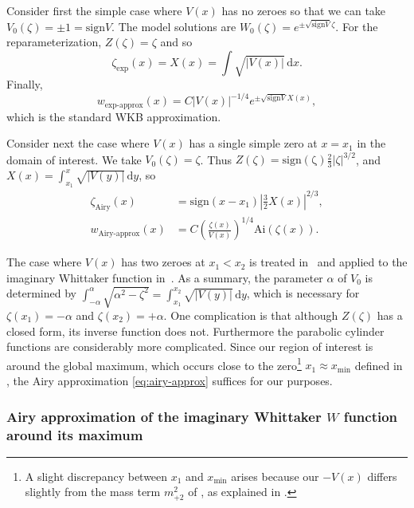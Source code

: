 Consider first the simple case where $V(x)$ has no zeroes so that we can take $V_{0}(\zeta)=\pm1=\mathrm{sign}V$. The model solutions are $W_{0}(\zeta)=e^{\pm\sqrt{\mathrm{sign}V}\zeta}$. For the reparameterization, $Z(\zeta)=\zeta$ and so 
\[
\zeta_{\textrm{exp}}(x)=X(x)=\int\sqrt{\left|V(x)\right|}\,\mathrm{d}x.
\]
 Finally, 
\begin{equation}
w_{\textrm{exp-approx}}(x)=C\left|V(x)\right|^{-1/4}e^{\pm\sqrt{\mathrm{sign}V}X(x)},\label{eq:exp-approx}
\end{equation}
 which is the standard WKB approximation. 

Consider next the case where $V(x)$ has a single simple zero at $x=x_{1}$ in the domain of interest. We take $V_{0}(\zeta)=\zeta$. Thus $Z(\zeta)=\mathrm{sign(\zeta)}\tfrac{2}{3}\left|\zeta\right|^{3/2}$, and $X(x)=\int_{x_{1}}^{x}\sqrt{\left|V(y)\right|}\,\mathrm{d}y$, so 
\begin{align}
\zeta_{\textrm{Airy}}(x) & =\mathrm{sign}(x-x_{1})\left|\tfrac{3}{2}X(x)\right|^{2/3},\\
w_{\textrm{Airy-approx}}(x) & =C\left(\frac{\zeta(x)}{V(x)}\right)^{1/4}\mathrm{Ai}\left(\zeta(x)\right).\label{eq:airy-approx}
\end{align}

The case where $V(x)$ has two zeroes at $x_{1}<x_{2}$ is treated in~\cite{Olver137} and applied to the imaginary Whittaker function in~\cite{Olver_1980}. As a summary, the parameter $\alpha$ of $V_{0}$ is determined by $\int_{-\alpha}^{\alpha}\sqrt{\alpha^{2}-\zeta^{2}}=\int_{x_{1}}^{x_{2}}\sqrt{\left|V(y)\right|}\,\mathrm{d}y$, which is necessary for $\zeta(x_{1})=-\alpha$ and $\zeta(x_{2})=+\alpha$. One complication is that although $Z(\zeta)$ has a closed form, its inverse function does not. Furthermore the parabolic cylinder functions are considerably more complicated. Since our region of interest is around the global maximum, which occurs close to the zero\footnote{A slight discrepancy between $x_{1}$ and $x_{\mathrm{min}}$ arises because our $-V(x)$ differs slightly from the mass term $m_{+2}^{2}$ of , as explained in . } $x_{1}\approx x_{\mathrm{min}}$ defined in , the Airy approximation \eqref{eq:airy-approx} suffices for our purposes. 

\subsubsection{\label{subsec:Airy-Whittaker}Airy approximation of the imaginary Whittaker \texorpdfstring{$W$}{W} function around its maximum }

